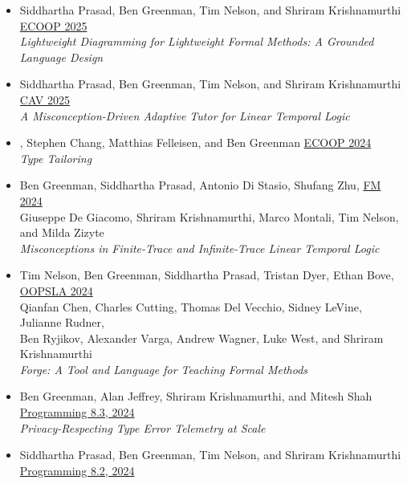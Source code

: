 \documentclass[11pt]{article}
\begin{document}
\begin{itemize}
\item
  Siddhartha Prasad, Ben Greenman, Tim Nelson, and Shriram Krishnamurthi \hfill \href{https://2025.ecoop.org/}{ECOOP 2025} \\
    \emph{Lightweight Diagramming for Lightweight Formal Methods: A Grounded Language Design} \hfill {}
\item
  Siddhartha Prasad, Ben Greenman, Tim Nelson, and Shriram Krishnamurthi \hfill \href{https://conferences.i-cav.org/2025/}{CAV 2025} \\
    \emph{A Misconception-Driven Adaptive Tutor for Linear Temporal Logic} \hfill {}
\item
  , Stephen Chang, Matthias Felleisen, and Ben Greenman \hfill \href{https://2024.ecoop.org/}{ECOOP 2024} \\
    \emph{Type Tailoring} \hfill {}
\item
  Ben Greenman, Siddhartha Prasad, Antonio Di Stasio, Shufang Zhu, \hfill \href{https://www.fm24.polimi.it/}{FM 2024} \\
  Giuseppe De Giacomo, Shriram Krishnamurthi, Marco Montali, Tim Nelson, and Milda Zizyte \\
    \emph{Misconceptions in Finite-Trace and Infinite-Trace Linear Temporal Logic} \hfill {}
\item
  {Tim Nelson}, {Ben Greenman}, {Siddhartha Prasad}, {Tristan Dyer}, {Ethan Bove},
    \hfill \href{https://2024.splashcon.org/track/splash-2024-oopsla}{OOPSLA 2024} \\
  {Qianfan Chen}, {Charles Cutting}, {Thomas Del Vecchio}, {Sidney LeVine}, {Julianne Rudner}, \\
  {Ben Ryjikov}, {Alexander Varga}, {Andrew Wagner}, {Luke West}, and {Shriram Krishnamurthi} \\
    \emph{Forge: A Tool and Language for Teaching Formal Methods} \hfill {} %
\item
  Ben Greenman, Alan Jeffrey, Shriram Krishnamurthi, and Mitesh Shah \hfill \href{https://2024.programming-conference.org/}{Programming 8.3, 2024} \\
  \emph{Privacy-Respecting Type Error Telemetry at Scale} \hfill {}
\item
  Siddhartha Prasad, Ben Greenman, Tim Nelson, and Shriram Krishnamurthi \hfill \href{https://2024.programming-conference.org/}{Programming 8.2, 2024} \\

\end{itemize}
\end{document}
